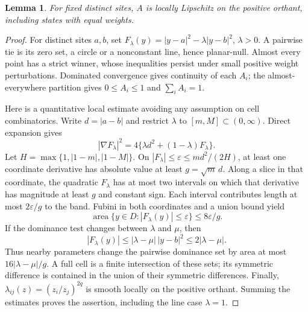 \documentclass[11pt]{article}
\newtheorem{lemma}[theorem]{Lemma}
\newcommand{\area}{\operatorname{area}}
\begin{document}
\begin{lemma}\label{regularity}
For fixed distinct sites, $A$ is locally Lipschitz on the positive orthant, including states with equal weights.
\end{lemma}
\begin{proof}
For distinct sites $a,b$, set $F_\lambda(y)=|y-a|^2-\lambda|y-b|^2$, $\lambda>0$. A pairwise tie is its zero set, a circle or a nonconstant line, hence planar-null. Almost every point has a strict winner, whose inequalities persist under small positive weight perturbations. Dominated convergence gives continuity of each $A_i$; the almost-everywhere partition gives $0\leq A_i\leq1$ and $\sum_iA_i=1$.

Here is a quantitative local estimate avoiding any assumption on cell combinatorics. Write $d=|a-b|$ and restrict $\lambda$ to $[m,M]\subset(0,\infty)$. Direct expansion gives
\begin{equation}
 |\nabla F_\lambda|^2=4\{\lambda d^2+(1-\lambda)F_\lambda\}.\label{gradient}
\end{equation}
Let $H=\max\{1,|1-m|,|1-M|\}$. On $|F_\lambda|\leq\varepsilon\leq md^2/(2H)$, at least one coordinate derivative has absolute value at least $g=\sqrt m\,d$. Along a slice in that coordinate, the quadratic $F_\lambda$ has at most two intervals on which that derivative has magnitude at least $g$ and constant sign. Each interval contributes length at most $2\varepsilon/g$ to the band. Fubini in both coordinates and a union bound yield
\[
 \area\{y\in D:|F_\lambda(y)|\leq\varepsilon\}
 \leq 8\varepsilon/g.
\]
If the dominance test changes between $\lambda$ and $\mu$, then
\[
 |F_\lambda(y)|\leq |\lambda-\mu|\,|y-b|^2
                   \leq2|\lambda-\mu|.
\]
Thus nearby parameters change the pairwise dominance set by area at most $16|\lambda-\mu|/g$. A full cell is a finite intersection of these sets; its symmetric difference is contained in the union of their symmetric differences. Finally, $\lambda_{ij}(z)=(z_i/z_j)^{2q}$ is smooth locally on the positive orthant. Summing the estimates proves the assertion, including the line case $\lambda=1$.
\end{proof}
\end{document}
